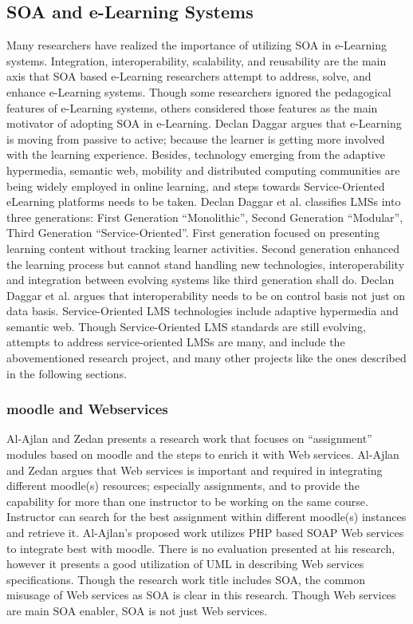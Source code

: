 \documentclass[12pt,a4paper,final,twoside,onecolumn,titlepage]{book}
\begin{document}
\subsection{SOA and e-Learning Systems}
Many researchers have realized the importance of utilizing \gls{SOA} in e-Learning systems. Integration, interoperability, scalability, and reusability are the main axis that \gls{SOA} based e-Learning researchers attempt to address, solve, and enhance e-Learning systems. Though some researchers ignored the pedagogical features of e-Learning systems, others considered those features as the main motivator of adopting \gls{SOA} in e-Learning.
Declan Daggar \cite{R58} argues that e-Learning is moving from passive to active; because the learner is getting more involved with the learning experience. Besides, technology emerging from the adaptive hypermedia, semantic web, mobility and distributed computing communities are being widely employed in online learning, and steps towards Service-Oriented eLearning platforms needs to be taken. Declan Daggar et al. classifies \gls{LMS}s into three generations: First Generation “Monolithic”, Second Generation “Modular”, Third Generation “Service-Oriented”. First generation focused on presenting learning content without tracking learner activities. Second generation enhanced the learning process but cannot stand handling new technologies, interoperability and integration between evolving systems like third generation shall do. Declan Daggar et al. argues that interoperability needs to be on control basis not just on data basis. Service-Oriented \gls{LMS} technologies include adaptive hypermedia and semantic web. Though Service-Oriented \gls{LMS} standards are still evolving, attempts to address service-oriented \gls{LMS}s are many, and include the abovementioned research project, and many other projects like the ones described in the following sections.

\subsubsection{\gls{moodle} and Webservices}
Al-Ajlan and Zedan \cite{R59} presents a research work that focuses on “assignment” modules based on \gls{moodle}  and the steps to enrich it with Web services. Al-Ajlan and Zedan argues that Web services is important and required in integrating different \gls{moodle}(s) resources; especially assignments, and to provide the capability for more than one instructor to be working on the same course. Instructor can search for the best assignment within different \gls{moodle}(s) instances and retrieve it. Al-Ajlan’s proposed work utilizes PHP based \gls{SOAP} Web services to integrate best with \gls{moodle}. There is no evaluation presented at his research, however it presents a good utilization of UML in describing Web services specifications. Though the research work title includes \gls{SOA}, the common misusage of Web services as \gls{SOA} is clear in this research. Though Web services are main \gls{SOA} enabler, \gls{SOA} is not just Web services.
\end{document}
